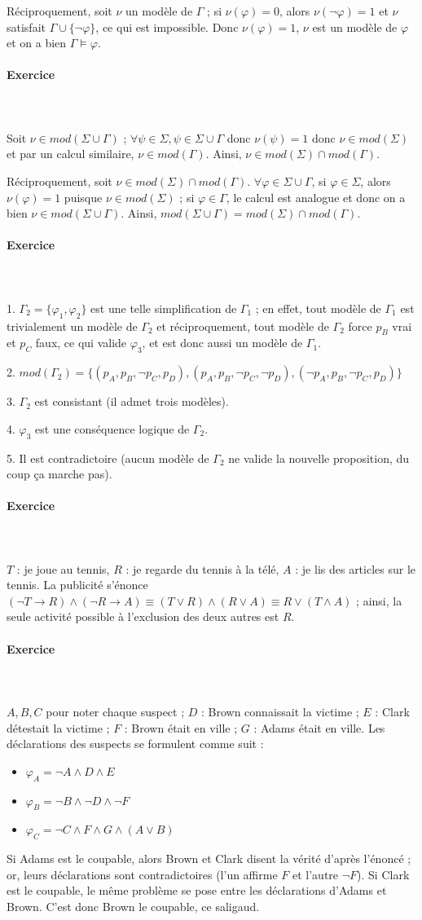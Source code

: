 \documentclass[a4paper]{article}
\newcounter{noexo}
\newcommand{\exo}{\stepcounter{noexo} \paragraph{Exercice \thenoexo} ~\\ ~\\}
\begin{document}
Réciproquement, soit $\nu$ un modèle de $\Gamma$ ; si $\nu(\varphi)=0$, alors $\nu(\neg\varphi)=1$ et $\nu$ satisfait $\Gamma\cup\{\neg\varphi\}$, ce qui est impossible. Donc $\nu(\varphi)=1$, $\nu$ est un modèle de $\varphi$ et on a bien $\Gamma\models\varphi$.

\exo
Soit $\nu\in mod(\Sigma\cup\Gamma)$ ; $\forall\psi\in\Sigma, \psi\in\Sigma\cup\Gamma$ donc $\nu(\psi)=1$ donc $\nu\in mod(\Sigma)$ et par un calcul similaire, $\nu\in mod(\Gamma)$. Ainsi, $\nu\in mod(\Sigma)\cap mod(\Gamma)$.

Réciproquement, soit $\nu\in mod(\Sigma)\cap mod(\Gamma)$. $\forall\varphi\in\Sigma\cup\Gamma$, si $\varphi\in\Sigma$, alors $\nu(\varphi)=1$ puisque $\nu\in mod(\Sigma)$ ; si $\varphi\in\Gamma$, le calcul est analogue et donc on a bien $\nu\in mod(\Sigma\cup\Gamma)$. Ainsi, $mod(\Sigma\cup\Gamma)= mod(\Sigma)\cap mod(\Gamma)$.

\exo
1. $\Gamma_2=\{\varphi_1,\varphi_2\}$ est une telle simplification de $\Gamma_1$ ; en effet, tout modèle de $\Gamma_1$ est trivialement un modèle de $\Gamma_2$ et réciproquement, tout modèle de $\Gamma_2$ force $p_B$ vrai et $p_C$ faux, ce qui valide $\varphi_3$, et est donc aussi un modèle de $\Gamma_1$.

2. $mod(\Gamma_2)=\{(p_A, p_B, \neg p_C, p_D), (p_A, p_B, \neg p_C, \neg p_D), (\neg p_A, p_B, \neg p_C, p_D)\}$

3. $\Gamma_2$ est consistant (il admet trois modèles).

4. $\varphi_3$ est une conséquence logique de $\Gamma_2$.

5. Il est contradictoire (aucun modèle de $\Gamma_2$ ne valide la nouvelle proposition, du coup ça marche pas).

\exo
$T$ : je joue au tennis, $R$ : je regarde du tennis à la télé, $A$ : je lis des articles sur le tennis. La publicité s'énonce $(\neg T\rightarrow R) \wedge (\neg R \rightarrow A) \equiv (T \vee R)\wedge(R\vee A) \equiv R\vee(T\wedge A)$ ; ainsi, la seule activité possible à l'exclusion des deux autres est $R$.

\exo
$A, B, C$ pour noter chaque suspect ; $D$ : Brown connaissait la victime ; $E$ : Clark détestait la victime ; $F$ : Brown était en ville ; $G$ : Adams était en ville. Les déclarations des suspects se formulent comme suit :\begin{itemize}
  \item $\varphi_A = \neg A \wedge D \wedge E$
  \item $\varphi_B = \neg B \wedge \neg D \wedge \neg F$
  \item $\varphi_C = \neg C \wedge F \wedge G \wedge (A \vee B)$
\end{itemize}
Si Adams est le coupable, alors Brown et Clark disent la vérité d'après l'énoncé ; or, leurs déclarations sont contradictoires (l'un affirme $F$ et l'autre $\neg F$). Si Clark est le coupable, le même problème se pose entre les déclarations d'Adams et Brown. C'est donc Brown le coupable, ce saligaud.
\end{document}
